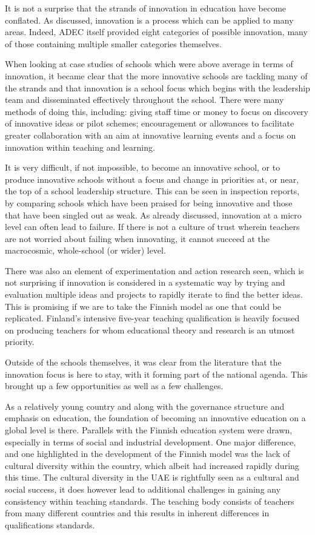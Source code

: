 \documentclass[11pt]{article}
\begin{document}
It is not a surprise that the strands of innovation in education have become conflated. As discussed, innovation is a process which can be applied to many areas. Indeed, ADEC itself provided eight categories of possible innovation, many of those containing multiple smaller categories themselves.

When looking at case studies of schools which were above average in terms of innovation, it became clear that the more innovative schools are tackling many of the strands and that innovation is a school focus which begins with the leadership team and disseminated effectively throughout the school. There were many methods of doing this, including: giving staff time or money to focus on discovery of innovative ideas or pilot schemes; encouragement or allowances to facilitate greater collaboration with an aim at innovative learning events and a focus on innovation within teaching and learning.

It is very difficult, if not impossible, to become an innovative school, or to produce innovative schools without a focus and change in priorities at, or near, the top of a school leadership structure. This can be seen in inspection reports, by comparing schools which have been praised for being innovative and those that have been singled out as weak. As already discussed, innovation at a micro level can often lead to failure. If there is not a culture of trust wherein teachers are not worried about failing when innovating, it cannot succeed at the macrocosmic, whole-school (or wider) level.

There was also an element of experimentation and action research seen, which is not surprising if innovation is considered in a systematic way by trying and evaluation multiple ideas and projects to rapidly iterate to find the better ideas. This is promising if we are to take the Finnish model as one that could be replicated. Finland's intensive five-year teaching qualification is heavily focused on producing teachers for whom educational theory and research is an utmost priority. 

Outside of the schools themselves, it was clear from the literature that the innovation focus is here to stay, with it forming part of the national agenda. This brought up a few opportunities as well as a few challenges.

As a relatively young country and along with the governance structure and emphasis on education, the foundation of becoming an innovative education on a global level is there. Parallels with the Finnish education system were drawn, especially in terms of social and industrial development. One major difference, and one highlighted in the development of the Finnish model was the lack of cultural diversity within the country, which albeit had increased rapidly during this time. The cultural diversity in the UAE is rightfully seen as a cultural and social success, it does however lead to additional challenges in gaining any consistency within teaching standards. The teaching body consists of teachers from many different countries and this results in inherent differences in qualifications standards.
\end{document}
